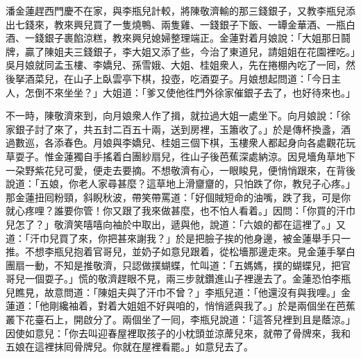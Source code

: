 潘金蓮趕西門慶不在家，與李瓶兒計較，將陳敬濟輸的那三錢銀子，又教李瓶兒添出七錢來，教來興兒買了一隻燒鴨、兩隻雞、一錢銀子下飯、一罈金華酒、一瓶白酒、一錢銀子裹餡涼糕，教來興兒媳婦整理端正。金蓮對着月娘說：「大姐那日鬪牌，贏了陳姐夫三錢銀子，李大姐又添了些，今治了東道兒，請姐姐在花園裡吃。」吳月娘就同孟玉樓、李嬌兒、孫雪娥、大姐、桂姐衆人，先在捲棚內吃了一囘，然後拏酒菜兒，在山子上臥雲亭下棋，投壺，吃酒耍子。月娘想起問道：「今日主人，怎倒不來坐坐？」大姐道：「爹又使他徃門外徐家催銀子去了，也好待來也。」

不一時，陳敬濟來到，向月娘衆人作了揖，就拉過大姐一處坐下。向月娘說：「徐家銀子討了來了，共五封二百五十兩，送到房裡，玉簫收了。」於是傳杯換盞，酒過數巡，各添春色。月娘與李嬌兒、桂姐三個下棋，玉樓衆人都起身向各處觀花玩草耍子。惟金蓮獨自手搖着白團紗扇兒，徃山子後芭蕉深處納涼。{}因見墻角草地下一朶野紫花兒可愛，便走去要摘。不想敬濟有心，一眼睃見，便悄悄跟來，{}在背後說道：「五娘，你老人家尋甚麼？這草地上滑齏齏的，只怕跌了你，教兒子心疼。」{}那金蓮扭囘粉頸，斜睨秋波，帶笑帶罵道：「好個賊短命的油嘴，跌了我，可是你就心疼哩？誰要你管！你又跟了我來做甚麼，也不怕人看着。」因問：「你買的汗巾兒怎了？」敬濟笑嘻嘻向袖於中取出，遞與他，說道：「六娘的都在這裡了。」又道：「汗巾兒買了來，你把甚來謝我？」於是把臉子挨的他身邊，被金蓮舉手只一推。不想李瓶兒抱着官哥兒，並奶子如意兒跟着，從松墻那邊走來。見金蓮手拏白團扇一動，不知是推敬濟，只認做撲蝴蝶，忙叫道：「五媽媽，撲的蝴蝶兒，把官哥兒一個耍子。」慌的敬濟趕眼不見，兩三步就鑽進山子裡邊去了。金蓮恐怕李瓶兒瞧見，故意問道：「陳姐夫與了汗巾不曾？」{}李瓶兒道：「他還沒有與我哩。」金蓮道：「他剛纔袖着，對着大姐姐不好與咱的，悄悄遞與我了。」於是兩個坐在芭蕉叢下花臺石上，開啟分了。兩個坐了一囘，李瓶兒說道：「這答兒裡到且是蔭涼。」因使如意兒：「你去叫迎春屋裡取孩子的小枕頭並涼蓆兒來，就帶了骨牌來，我和五娘在這裡抹囘骨牌兒。你就在屋裡看罷。」如意兒去了。

